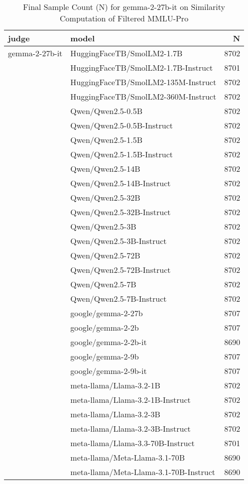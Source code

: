 \begin{table}[]
    \centering
     \caption{Final Sample Count (N) for gemma-2-27b-it on Similarity Computation of Filtered MMLU-Pro}
\begin{tabular}{llr}
\toprule
judge & model & N \\
\midrule
gemma-2-27b-it & HuggingFaceTB/SmolLM2-1.7B & 8702 \\
 & HuggingFaceTB/SmolLM2-1.7B-Instruct & 8701 \\
 & HuggingFaceTB/SmolLM2-135M-Instruct & 8702 \\
 & HuggingFaceTB/SmolLM2-360M-Instruct & 8702 \\
 & Qwen/Qwen2.5-0.5B & 8702 \\
 & Qwen/Qwen2.5-0.5B-Instruct & 8702 \\
 & Qwen/Qwen2.5-1.5B & 8702 \\
 & Qwen/Qwen2.5-1.5B-Instruct & 8702 \\
 & Qwen/Qwen2.5-14B & 8702 \\
 & Qwen/Qwen2.5-14B-Instruct & 8702 \\
 & Qwen/Qwen2.5-32B & 8702 \\
 & Qwen/Qwen2.5-32B-Instruct & 8702 \\
 & Qwen/Qwen2.5-3B & 8702 \\
 & Qwen/Qwen2.5-3B-Instruct & 8702 \\
 & Qwen/Qwen2.5-72B & 8702 \\
 & Qwen/Qwen2.5-72B-Instruct & 8702 \\
 & Qwen/Qwen2.5-7B & 8702 \\
 & Qwen/Qwen2.5-7B-Instruct & 8702 \\
 & google/gemma-2-27b & 8707 \\
 & google/gemma-2-2b & 8707 \\
 & google/gemma-2-2b-it & 8690 \\
 & google/gemma-2-9b & 8707 \\
 & google/gemma-2-9b-it & 8707 \\
 & meta-llama/Llama-3.2-1B & 8702 \\
 & meta-llama/Llama-3.2-1B-Instruct & 8702 \\
 & meta-llama/Llama-3.2-3B & 8702 \\
 & meta-llama/Llama-3.2-3B-Instruct & 8702 \\
 & meta-llama/Llama-3.3-70B-Instruct & 8701 \\
 & meta-llama/Meta-Llama-3.1-70B & 8690 \\
 & meta-llama/Meta-Llama-3.1-70B-Instruct & 8690 \\

\end{tabular}
\end{table}
